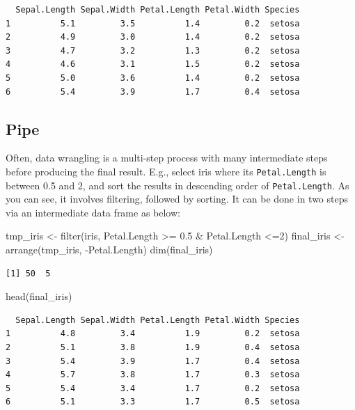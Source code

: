\documentclass[
  letterpaper,
  DIV=11,
  numbers=noendperiod]{scrreprt}
\newenvironment{Shaded}{\begin{snugshade}}{\end{snugshade}}
\newcommand{\DecValTok}[1]{\textcolor[rgb]{0.68,0.00,0.00}{#1}}
\newcommand{\FloatTok}[1]{\textcolor[rgb]{0.68,0.00,0.00}{#1}}
\newcommand{\FunctionTok}[1]{\textcolor[rgb]{0.28,0.35,0.67}{#1}}
\newcommand{\NormalTok}[1]{\textcolor[rgb]{0.00,0.23,0.31}{#1}}
\newcommand{\OtherTok}[1]{\textcolor[rgb]{0.00,0.23,0.31}{#1}}
\newcommand{\SpecialCharTok}[1]{\textcolor[rgb]{0.37,0.37,0.37}{#1}}
\begin{document}
\begin{verbatim}
  Sepal.Length Sepal.Width Petal.Length Petal.Width Species
1          5.1         3.5          1.4         0.2  setosa
2          4.9         3.0          1.4         0.2  setosa
3          4.7         3.2          1.3         0.2  setosa
4          4.6         3.1          1.5         0.2  setosa
5          5.0         3.6          1.4         0.2  setosa
6          5.4         3.9          1.7         0.4  setosa
\end{verbatim}

\subsection{Pipe}\label{pipe}

Often, data wrangling is a multi-step process with many intermediate
steps before producing the final result. E.g., select iris where its
\texttt{Petal.Length} is between 0.5 and 2, and sort the results in
descending order of \texttt{Petal.Length}. As you can see, it involves
filtering, followed by sorting. It can be done in two steps via an
intermediate data frame as below:

\begin{Shaded}
\begin{Highlighting}[]
\NormalTok{tmp\_iris }\OtherTok{\textless{}{-}} \FunctionTok{filter}\NormalTok{(iris, Petal.Length }\SpecialCharTok{\textgreater{}=} \FloatTok{0.5} \SpecialCharTok{\&}\NormalTok{ Petal.Length }\SpecialCharTok{\textless{}=}\DecValTok{2}\NormalTok{)}
\NormalTok{final\_iris }\OtherTok{\textless{}{-}} \FunctionTok{arrange}\NormalTok{(tmp\_iris, }\SpecialCharTok{{-}}\NormalTok{Petal.Length)}
\FunctionTok{dim}\NormalTok{(final\_iris)}
\end{Highlighting}
\end{Shaded}

\begin{verbatim}
[1] 50  5
\end{verbatim}

\begin{Shaded}
\begin{Highlighting}[]
\FunctionTok{head}\NormalTok{(final\_iris)}
\end{Highlighting}
\end{Shaded}

\begin{verbatim}
  Sepal.Length Sepal.Width Petal.Length Petal.Width Species
1          4.8         3.4          1.9         0.2  setosa
2          5.1         3.8          1.9         0.4  setosa
3          5.4         3.9          1.7         0.4  setosa
4          5.7         3.8          1.7         0.3  setosa
5          5.4         3.4          1.7         0.2  setosa
6          5.1         3.3          1.7         0.5  setosa
\end{verbatim}
\end{document}
